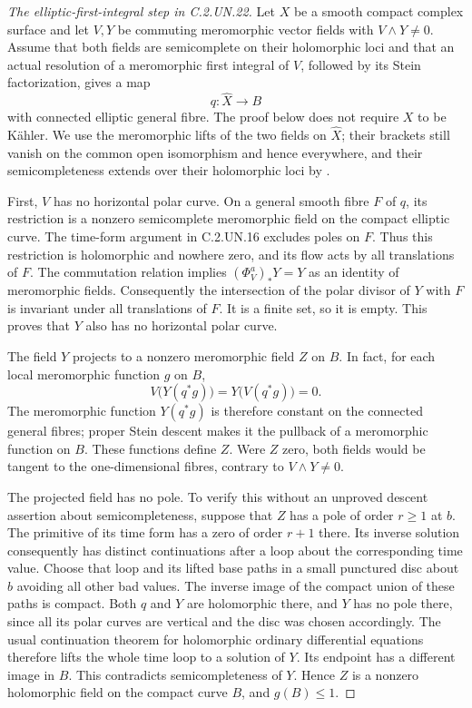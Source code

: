 \begin{proof}[The elliptic-first-integral step in C.2.UN.22]
Let $X$ be a smooth compact complex surface and let $V,Y$ be
commuting meromorphic vector fields with $V\wedge Y\ne0$.
Assume that both fields are semicomplete on their holomorphic
loci and that an actual resolution of a meromorphic first
integral of $V$, followed by its Stein factorization, gives
a map
\[
 q:\widehat X\longrightarrow B
 \tag{C.RF.1}
\]
with connected elliptic general fibre.  The proof below does
not require $X$ to be K\"ahler.  We use the meromorphic lifts
of the two fields on $\widehat X$; their brackets still vanish
on the common open isomorphism and hence everywhere, and
their semicompleteness extends over their holomorphic loci
by \cite[Theorem~3.3]{Guillot2024}.

First, $V$ has no horizontal polar curve.  On a general
smooth fibre $F$ of $q$, its restriction is a nonzero
semicomplete meromorphic field on the compact elliptic
curve.  The time-form argument in C.2.UN.16 excludes poles
on $F$.  Thus this restriction is holomorphic and nowhere
zero, and its flow acts by all translations of $F$.
The commutation relation implies
$(\Phi_V^a)_*Y=Y$ as an identity of meromorphic fields.
Consequently the intersection of the polar divisor of $Y$
with $F$ is invariant under all translations of $F$.
It is a finite set, so it is empty.  This proves that
$Y$ also has no horizontal polar curve.

The field $Y$ projects to a nonzero meromorphic field $Z$
on $B$.  In fact, for each local meromorphic function $g$
on $B$,
\[
 V\bigl(Y(q^*g)\bigr)
   =Y\bigl(V(q^*g)\bigr)=0.
\]
The meromorphic function $Y(q^*g)$ is therefore constant
on the connected general fibres; proper Stein descent
makes it the pullback of a meromorphic function on $B$.
These functions define $Z$.  Were $Z$ zero, both fields
would be tangent to the one-dimensional fibres, contrary
to $V\wedge Y\ne0$.

The projected field has no pole.  To verify this without
an unproved descent assertion about semicompleteness,
suppose that $Z$ has a pole of order $r\ge1$ at $b$.
The primitive of its time form has a zero of order $r+1$
there.  Its inverse solution consequently has distinct
continuations after a loop about the corresponding time
value.  Choose that loop and its lifted base paths in a
small punctured disc about $b$ avoiding all other bad
values.  The inverse image of the compact union of these
paths is compact.  Both $q$ and $Y$ are holomorphic there,
and $Y$ has no pole there, since all its polar curves are
vertical and the disc was chosen accordingly.  The usual
continuation theorem for holomorphic ordinary differential
equations therefore lifts the whole time loop to a
solution of $Y$.  Its endpoint has a different image in
$B$.  This contradicts semicompleteness of $Y$.
Hence $Z$ is a nonzero holomorphic field on the compact
curve $B$, and $g(B)\le1$.


\end{proof}
